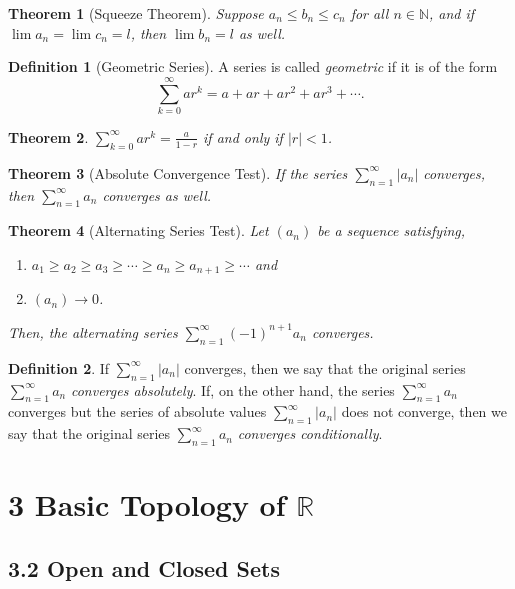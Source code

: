 \documentclass{amsart}
\newtheorem*{theorem}{Theorem}
\theoremstyle{definition}
\newtheorem*{definition}{Definition}
\newcommand{\N}{\mathbb{N}}
\newcommand{\R}{\mathbb{R}}
\newcommand{\abs}[1]{|#1|}
\begin{document}
\begin{theorem}[Squeeze Theorem]
  Suppose $a_n \le b_n \le c_n$ for all $n \in \N$, and if $\lim a_n = \lim c_n
  = l$, then $\lim b_n = l$ as well.
\end{theorem}

\begin{definition}[Geometric Series]
  A series is called \emph{geometric} if it is of the form
  \[
    \sum_{k=0}^\infty ar^k = a + ar + ar^2 + ar^3 + \cdots.
  \]
\end{definition}

\begin{theorem}
  $\sum_{k=0}^\infty ar^k = \frac{a}{1 - r}$ if and only if $\abs{r} < 1$.
\end{theorem}

\begin{theorem}[Absolute Convergence Test]
  If the series $\sum_{n=1}^\infty \abs{a_n}$ converges, then $\sum_{n=1}^\infty
  a_n$ converges as well.
\end{theorem}

\begin{theorem}[Alternating Series Test]
  Let $(a_n)$ be a sequence satisfying,
  \begin{enumerate}[label={(\roman*)}]
    \item $a_1 \ge a_2 \ge a_3 \ge \cdots \ge a_n \ge a_{n+1} \ge \cdots$ and
    \item $(a_n) \rightarrow 0$.
  \end{enumerate}
  Then, the alternating series $\sum_{n=1}^\infty {(-1)}^{n+1} a_n$ converges.
\end{theorem}

\begin{definition}
  If $\sum_{n=1}^\infty \abs{a_n}$ converges, then we say that the original
  series $\sum_{n=1}^\infty a_n$ \emph{converges absolutely}. If, on the other
  hand, the series $\sum_{n=1}^\infty a_n$ converges but the series of absolute
  values $\sum_{n=1}^\infty \abs{a_n}$ does not converge, then we say that the
  original series $\sum_{n=1}^\infty a_n$ \emph{converges conditionally}.
\end{definition}

\section*{3 Basic Topology of $\R$}

\subsection*{3.2 Open and Closed Sets}
\end{document}
